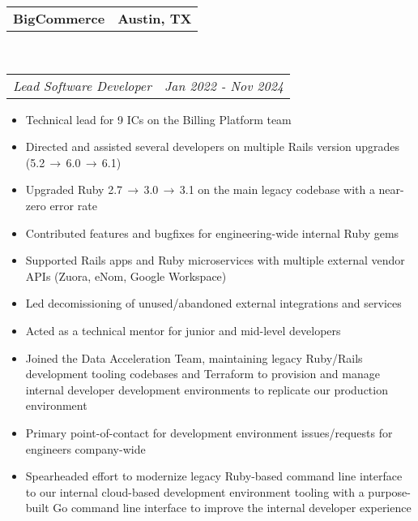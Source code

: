 \documentclass[10pt,letterpaper]{article}
\makeatletter
\newcommand{\headerrow}[2]
{\begin{tabular*}{\linewidth}{l@{\extracolsep{\fill}}r}
  #1 &
  #2 \\
\end{tabular*}}
\newenvironment{indentsection}[1]%
{\begin{list}{}%
  {\setlength{\leftmargin}{#1}}%
  \item[]%
}
{\end{list}}
\makeatother
\begin{document}
\begin{indentsection}{\parindent}
  \headerrow
    {\textbf{BigCommerce} }
    {\textbf{Austin, TX}}
  \\
  \headerrow
    {\emph{Lead Software Developer}}
    {\emph{Jan 2022 - Nov 2024}}

  \begin{itemize}
  \renewcommand{\labelitemi}{$-$}
  \vspace{-0.1in}
    \item Technical lead for 9 ICs on the Billing Platform team
    \item Directed and assisted several developers on multiple Rails version upgrades (5.2$\,\to\,$6.0$\,\to\,$6.1)
    \item Upgraded Ruby 2.7$\,\to\,$3.0$\,\to\,$3.1 on the main legacy codebase with a near-zero error rate
    \item Contributed features and bugfixes for engineering-wide internal Ruby gems
    \item Supported Rails apps and Ruby microservices with multiple external vendor APIs (Zuora, eNom, Google Workspace)
    \item Led decomissioning of unused/abandoned external integrations and services
    \item Acted as a technical mentor for junior and mid-level developers
    \item Joined the Data Acceleration Team, maintaining legacy Ruby/Rails development tooling codebases and Terraform to provision and manage internal developer development environments to replicate our production environment
    \item Primary point-of-contact for development environment issues/requests for engineers company-wide
    \item Spearheaded effort to modernize legacy Ruby-based command line interface to our internal cloud-based development environment tooling with a purpose-built Go command line interface to improve the internal developer experience
  \end{itemize}
\end{indentsection}
\end{document}
